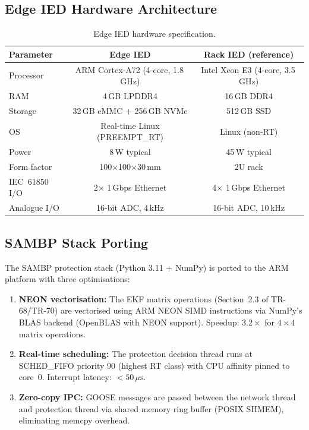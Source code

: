 \documentclass[11pt, a4paper]{article}
\begin{document}
\subsection{Edge IED Hardware Architecture}

\begin{table}[ht]
\centering
\caption{Edge IED hardware specification.}
\label{tab:hw}
\begin{tabular}{lcc}
\toprule
Parameter & Edge IED & Rack IED (reference) \\
\midrule
Processor & ARM Cortex-A72 (4-core, 1.8\,GHz) & Intel Xeon E3 (4-core, 3.5\,GHz) \\
RAM & 4\,GB LPDDR4 & 16\,GB DDR4 \\
Storage & 32\,GB eMMC + 256\,GB NVMe & 512\,GB SSD \\
OS & Real-time Linux (PREEMPT\_RT) & Linux (non-RT) \\
Power & 8\,W typical & 45\,W typical \\
Form factor & 100$\times$100$\times$30\,mm & 2U rack \\
IEC~61850 I/O & 2$\times$ 1\,Gbps Ethernet & 4$\times$ 1\,Gbps Ethernet \\
Analogue I/O & 16-bit ADC, 4\,kHz & 16-bit ADC, 10\,kHz \\
\bottomrule
\end{tabular}
\end{table}

\subsection{SAMBP Stack Porting}

The SAMBP protection stack (Python 3.11 + NumPy) is ported to the ARM
platform with three optimisations:

\begin{enumerate}
  \item \textbf{NEON vectorisation:} The EKF matrix operations
    (Section~2.3 of TR-68/TR-70) are vectorised using ARM NEON SIMD
    instructions via NumPy's BLAS backend (OpenBLAS with NEON support).
    Speedup: $3.2\times$ for $4\times 4$ matrix operations.

  \item \textbf{Real-time scheduling:} The protection decision thread
    runs at SCHED\_FIFO priority 90 (highest RT class) with CPU affinity
    pinned to core~0. Interrupt latency: $< 50\,\mu\text{s}$.

  \item \textbf{Zero-copy IPC:} GOOSE messages are passed between the
    network thread and protection thread via shared memory ring buffer
    (POSIX SHMEM), eliminating memcpy overhead.
\end{enumerate}
\end{document}
